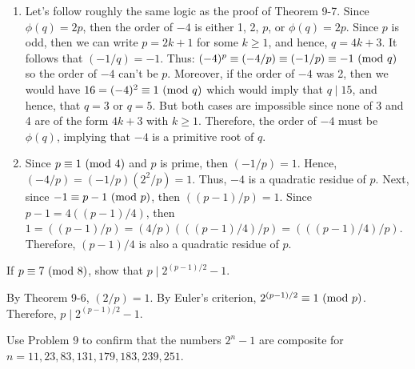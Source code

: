 \begin{solution}
    \begin{enumerate}
        \item Let's follow roughly the same logic as the proof of Theorem 9-7. Since $\phi(q) = 2p$, then the order of $-4$ is either 1, 2, $p$, or $\phi(q) = 2p$. Since $p$ is odd, then we can write $p = 2k+1$ for some $k \geq 1$, and hence, $q = 4k+3$. It follows that $(-1/q) = -1$. Thus: $(-4)^p \equiv (-4/p) \equiv (-1/p) \equiv -1 \ (\mathrm{mod}\ q)$ so the order of $-4$ can't be $p$. Moreover, if the order of $-4$ was 2, then we would have $16 = (-4)^2 \equiv 1 \ (\mathrm{mod}\ q)$ which would imply that $q \mid 15$, and hence, that $q = 3$ or $q = 5$. But both cases are impossible since none of 3 and 4 are of the form $4k+3$ with $k \geq 1$. Therefore, the order of $-4$ must be $\phi(q)$, implying that $-4$ is a primitive root of $q$.
        \item Since $p \equiv 1 \ (\mathrm{mod}\ 4)$ and $p$ is prime, then $(-1/p) = 1$. Hence, $(-4/p) = (-1/p)(2^2/p) = 1$. Thus, $-4$ is a quadratic residue of $p$. Next, since $-1 \equiv p-1 \ (\mathrm{mod}\ p)$, then $((p-1)/p) = 1$. Since $p-1 = 4((p-1)/4)$, then $1 = ((p-1)/p) = (4/p)(((p-1)/4)/p) = (((p-1)/4)/p)$. Therefore, $(p-1)/4$ is also a quadratic residue of $p$.\\
    \end{enumerate}
\end{solution}

\begin{exercise}
    If $p \equiv 7 \ (\mathrm{mod}\ 8)$, show that $p \mid 2^{(p-1)/2} - 1$.  \\
\end{exercise}

\begin{solution}
    By Theorem 9-6, $(2/p) = 1$. By Euler's criterion, $2^{(p-1)/2} \equiv 1 \ (\mathrm{mod}\ p)$. Therefore, $p \mid 2^{(p-1)/2} - 1$. \\
\end{solution}

\begin{exercise}
    Use Problem 9 to confirm that the numbers $2^n - 1$ are composite for $n = 11,23,83, 131,179,183,239,251$. \\
\end{exercise}

